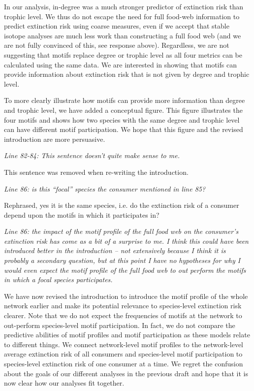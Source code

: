\documentclass[12pt]{article}
\newcommand{\us}{\rm \setlength{\leftskip}{0.3cm} \setlength{\rightskip}{0.3cm}}
\newcommand{\them}{\it \setlength{\leftskip}{0cm} \setlength{\rightskip}{0cm}}
\begin{document}
        \us In our analysis, in-degree was a much stronger predictor of extinction risk than trophic level. We thus do not escape the need for full food-web information to predict extinction risk using coarse measures, even if we accept that stable isotope analyses are much less work than constructing a full food web (and we are not fully convinced of this, see response above). 
        Regardless, we are not suggesting that motifs replace degree or trophic level as all four metrics can be calculated using the same data. We are interested in showing that motifs can provide information about extinction risk that is not given by degree and trophic level.
        
        
        To more clearly illustrate how motifs can provide more information than degree and trophic level, we have added a conceptual figure. This figure illustrates the four motifs and shows how two species with the same degree and trophic level can have different motif participation. We hope that this figure and the revised introduction are more persuasive.
        
        
        \them
        Line 82-84: This sentence doesn’t quite make sense to me.
        
        \us
        This sentence was removed when re-writing the introduction.
        
        \them
        Line 86: is this “focal” species the consumer mentioned in line 85?
        
        \us
        Rephrased, yes it is the same species, i.e. do the extinction risk of a consumer depend upon the motifs in which it participates in?
        
        \them
        Line 86: the impact of the motif profile of the full food web on the consumer’s extinction risk has come as a bit of a surprise to me. I think this could have been introduced better in the introduction – not extensively because I think it is probably a secondary question, but at this point I have no hypotheses for why I would even expect the motif profile of the full food web to out perform the motifs in which a focal species participates.
        
        \us
        We have now revised the introduction to introduce the motif profile of the whole network earlier and make its potential relevance to species-level extinction risk clearer.
        Note that we do not expect the frequencies of motifs at the network to out-perform species-level motif participation. In fact, we do not compare the predictive abilities of motif profiles and motif participation as these models relate to different things. We connect network-level motif profiles to the network-level average extinction risk of all consumers and species-level motif participation to species-level extinction risk of one consumer at a time. We regret the confusion about the goals of our different analyses in the previous draft and hope that it is now clear how our analyses fit together.
        
\end{document}
